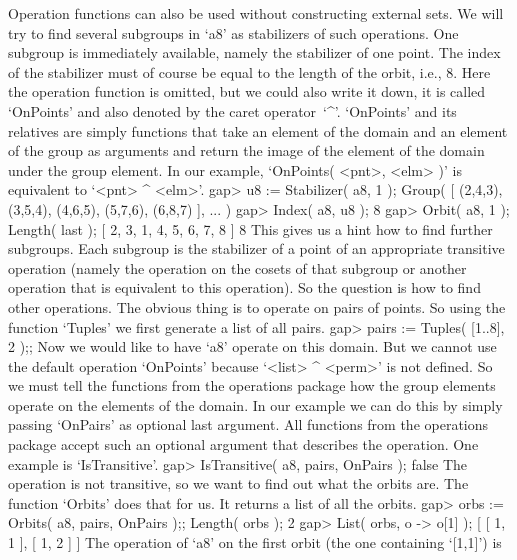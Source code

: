 
Operation functions can also be used  without constructing external sets.
We will  try to find  several  subgroups in `a8'   as stabilizers of such
operations. One subgroup  is immediately available, namely the stabilizer
of one point. The index of the stabilizer must  of course be equal to the
length of the orbit, i.e., 8. Here the operation function is omitted, but
we could also write it down, it is called  `OnPoints' and also denoted by
the caret operator~`^'. `OnPoints' and its relatives are simply functions
that  take an  element of  the  domain  and an  element  of the  group as
arguments  and return the  image of the element   of the domain under the
group element. In  our example, `OnPoints(  <pnt>, <elm> )' is equivalent
to `<pnt> ^ <elm>'.
\beginexample
    gap> u8 := Stabilizer( a8, 1 );
    Group( [ (2,4,3), (3,5,4), (4,6,5), (5,7,6), (6,8,7) ], ... )
    gap> Index( a8, u8 );
    8
    gap> Orbit( a8, 1 ); Length( last );
    [ 2, 3, 1, 4, 5, 6, 7, 8 ]
    8
\endexample
This gives us a hint how to find further  subgroups. Each subgroup is the
stabilizer of a point of an appropriate  transitive operation (namely the
operation  on  the cosets of that  subgroup  or another operation that is
equivalent to  this operation).  So the question   is how  to find  other
operations. The obvious thing is to operate  on pairs of points. So using
the function `Tuples' we first generate a list of all pairs.
\beginexample
    gap> pairs := Tuples( [1..8], 2 );;
\endexample
Now we would like to have `a8' operate on this  domain. But we cannot use
the  default operation `OnPoints'  because    `<list> ^ <perm>' is    not
defined. So we  must tell the functions  from the operations package  how
the group elements operate on the elements of  the domain. In our example
we can do this by simply passing `OnPairs' as optional last argument. All
functions  from the operations package  accept  such an optional argument
that describes the operation. One example is `IsTransitive'.
\beginexample
    gap> IsTransitive( a8, pairs, OnPairs );
    false 
\endexample
The operation is not transitive,  so we want to  find out what the orbits
are. The function `Orbits' does that for us. It returns a list of all the
orbits.
\beginexample
    gap> orbs := Orbits( a8, pairs, OnPairs );; Length( orbs );
    2
    gap> List( orbs, o -> o[1] );
    [ [ 1, 1 ], [ 1, 2 ] ]
\endexample
The operation of `a8' on the first orbit  (the one containing `[1,1]') is

